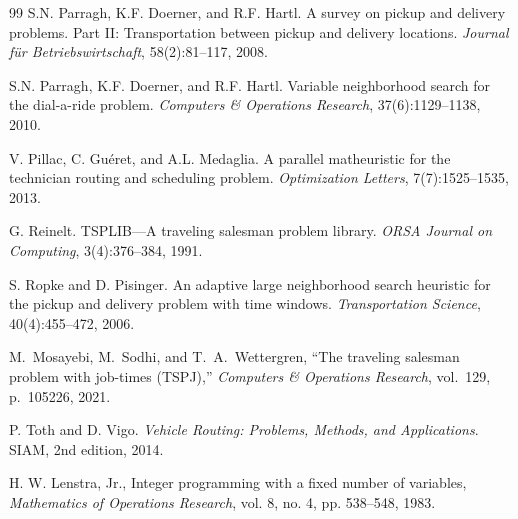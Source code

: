 \documentclass[sigconf]{acmart}
\begin{document}
\begin{thebibliography}{99}
S.N. Parragh, K.F. Doerner, and R.F. Hartl.
A survey on pickup and delivery problems. {Part II}: Transportation between pickup and delivery locations.
{\em Journal f{\"u}r Betriebswirtschaft}, 58(2):81--117, 2008.

S.N. Parragh, K.F. Doerner, and R.F. Hartl.
Variable neighborhood search for the dial-a-ride problem.
{\em Computers \& Operations Research}, 37(6):1129--1138, 2010.

V. Pillac, C. Gu\'{e}ret, and A.L. Medaglia.
A parallel matheuristic for the technician routing and scheduling problem.
{\em Optimization Letters}, 7(7):1525--1535, 2013.

G. Reinelt.
TSPLIB---A traveling salesman problem library.
{\em ORSA Journal on Computing}, 3(4):376--384, 1991.

S. Ropke and D. Pisinger.
An adaptive large neighborhood search heuristic for the pickup and delivery problem with time windows.
{\em Transportation Science}, 40(4):455--472, 2006.

M.~Mosayebi, M.~Sodhi, and T.~A.~Wettergren,
``The traveling salesman problem with job-times (TSPJ),''
\emph{Computers \& Operations Research}, vol.~129, p.~105226, 2021.


P. Toth and D. Vigo.
{\em Vehicle Routing: Problems, Methods, and Applications}.
SIAM, 2nd edition, 2014.

H. W. Lenstra, Jr.,
Integer programming with a fixed number of variables,
\emph{Mathematics of Operations Research},
vol. 8, no. 4, pp. 538--548, 1983.


\end{thebibliography}
\end{document}
